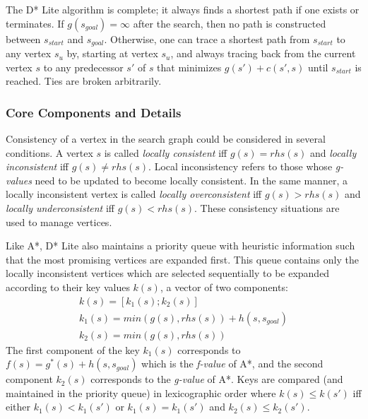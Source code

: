 \documentclass[10pt,journal]{IEEEtran}
\begin{document}

The D* Lite algorithm is complete; it always finds a shortest path if one exists or terminates. If $g(s_{goal}) = \infty$ after the search, then no path is constructed between $s_{start}$ and $s_{goal}$. Otherwise, one can trace a shortest path from $s_{start}$ to any vertex $s_{u}$ by, starting at vertex $s_{u}$, and always tracing back from the current vertex $s$ to any predecessor $s'$ of $s$ that minimizes $g(s') + c(s', s)$ until $s_{start}$ is reached. Ties are broken arbitrarily.

\subsubsection{Core Components and Details}

Consistency of a vertex in the search graph could be considered in several conditions. A vertex $s$ is called \textit{locally consistent} iff $g(s) = rhs(s)$ and \textit{locally inconsistent} iff $g(s) \neq rhs(s)$. Local inconsistency refers to those whose \textit{g-values} need to be updated to become locally consistent. In the same manner, a locally inconsistent vertex is called \textit{locally overconsistent} iff $g(s) > rhs(s)$ and \textit{locally underconsistent} iff $g(s) < rhs(s)$. These consistency situations are used to manage vertices.

Like A*, D* Lite also maintains a priority queue with heuristic information such that the most promising vertices are expanded first. This queue contains only the locally inconsistent vertices which are selected sequentially to be expanded according to their key values $k(s)$, a vector of two components:
\begin{gather*}
k(s) = [k_{1}(s); k_{2}(s)] \\
k_{1}(s) = min(g(s), rhs(s)) + h(s, s_{goal}) \\
k_{2}(s) = min(g(s), rhs(s))
\end{gather*}
The first component of the key $k_{1}(s)$ corresponds to $f(s) = g^*(s) + h(s, s_{goal})$ which is the \textit{f-value} of A*, and the second component $k_{2}(s)$ corresponds to the \textit{g-value} of A*. Keys are compared (and maintained in the priority queue) in lexicographic order where $k(s) \leq k(s')$ iff either $k_{1}(s) < k_{1}(s')$ or $k_{1}(s) = k_{1}(s')$ and $k_{2}(s) \leq k_{2}(s')$.
\end{document}
